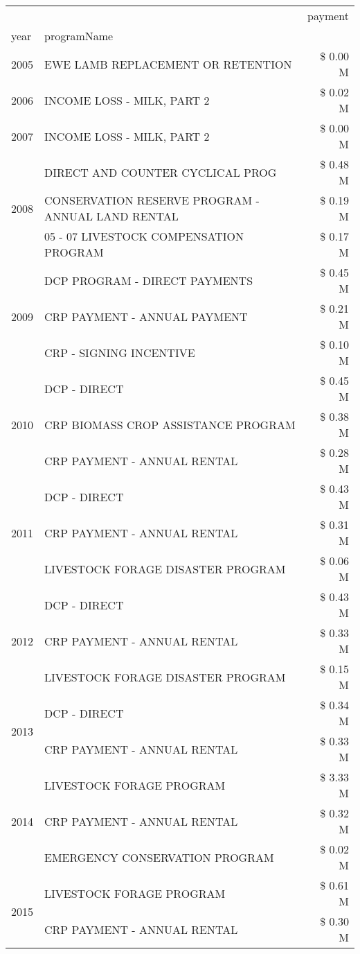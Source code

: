 \begin{tabular}{llr}
\toprule
 &  & payment \\
year & programName &  \\
\midrule
2005 & EWE LAMB REPLACEMENT OR RETENTION & \$ 0.00 M \\
\cline{1-3}
2006 & INCOME LOSS - MILK, PART 2 & \$ 0.02 M \\
\cline{1-3}
2007 & INCOME LOSS - MILK, PART 2 & \$ 0.00 M \\
\cline{1-3}
\multirow[t]{3}{*}{2008} & DIRECT AND COUNTER CYCLICAL PROG & \$ 0.48 M \\
 & CONSERVATION RESERVE PROGRAM - ANNUAL LAND RENTAL & \$ 0.19 M \\
 & 05 - 07 LIVESTOCK COMPENSATION PROGRAM & \$ 0.17 M \\
\cline{1-3}
\multirow[t]{3}{*}{2009} & DCP PROGRAM - DIRECT PAYMENTS & \$ 0.45 M \\
 & CRP PAYMENT - ANNUAL PAYMENT & \$ 0.21 M \\
 & CRP - SIGNING INCENTIVE & \$ 0.10 M \\
\cline{1-3}
\multirow[t]{3}{*}{2010} & DCP - DIRECT & \$ 0.45 M \\
 & CRP BIOMASS CROP ASSISTANCE PROGRAM & \$ 0.38 M \\
 & CRP PAYMENT - ANNUAL RENTAL & \$ 0.28 M \\
\cline{1-3}
\multirow[t]{3}{*}{2011} & DCP - DIRECT & \$ 0.43 M \\
 & CRP PAYMENT - ANNUAL RENTAL & \$ 0.31 M \\
 & LIVESTOCK FORAGE DISASTER PROGRAM & \$ 0.06 M \\
\cline{1-3}
\multirow[t]{3}{*}{2012} & DCP - DIRECT & \$ 0.43 M \\
 & CRP PAYMENT - ANNUAL RENTAL & \$ 0.33 M \\
 & LIVESTOCK FORAGE DISASTER PROGRAM & \$ 0.15 M \\
\cline{1-3}
\multirow[t]{2}{*}{2013} & DCP - DIRECT & \$ 0.34 M \\
 & CRP PAYMENT - ANNUAL RENTAL & \$ 0.33 M \\
\cline{1-3}
\multirow[t]{3}{*}{2014} & LIVESTOCK FORAGE PROGRAM & \$ 3.33 M \\
 & CRP PAYMENT - ANNUAL RENTAL & \$ 0.32 M \\
 & EMERGENCY CONSERVATION PROGRAM & \$ 0.02 M \\
\cline{1-3}
\multirow[t]{3}{*}{2015} & LIVESTOCK FORAGE PROGRAM & \$ 0.61 M \\
 & CRP PAYMENT - ANNUAL RENTAL & \$ 0.30 M \\

\end{tabular}
